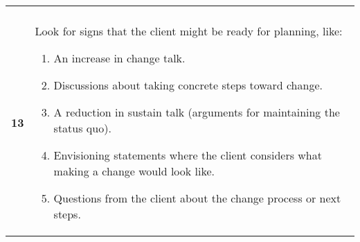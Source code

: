 \begin{tcolorbox}
\begin{tabularx}{\linewidth}{r X}
& \\[-12pt]

\textbf{13} & Look for signs that the client might be ready for planning, like: 
    \begin{enumerate}[itemsep=0pt, parsep=0pt]
       \item An increase in change talk.
       \item Discussions about taking concrete steps toward change.
       \item A reduction in sustain talk (arguments for maintaining the status quo).
       \item Envisioning statements where the client considers what making a change would look like.
       \item Questions from the client about the change process or next steps.
   \end{enumerate}

\vspace{-16pt}

\end{tabularx}
\vspace{-16pt}

\end{tcolorbox}



\clearpage






